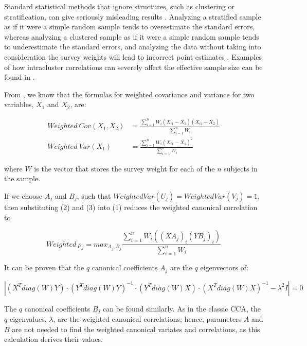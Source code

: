 Standard statistical methods that ignore structures, such as clustering or stratification, can give seriously misleading results \citep{holt1980}. Analyzing a stratified sample as if it were a simple random sample tends to overestimate the standard errors, whereas analyzing a clustered sample as if it were a simple random sample tends to underestimate the standard errors, and analyzing the data without taking into consideration the survey weights will lead to incorrect point estimates \citep{lumley2004}. Examples of how intracluster correlations can severely affect the effective sample size can be found in \citep{killip2004}.

From \citep{winship1994}, we know that the formulas for weighted covariance and variance for two variables, \(X_1\) and \(X_2\), are:

\begin{align}
Weighted\ Cov(X_1, X_2) &= \frac{\sum_{i=1}^{n}W_i(X_{i1} - \bar{X_{1}})(X_{i2} - \bar{X_{2}})}{\sum_{i=1}^{n}W_i}\\
Weighted\ Var(X_1) &= \frac{\sum_{i=1}^{n}W_i(X_{i1} - \bar{X_{1}})^2}{\sum_{i=1}^{n}W_i}
  \label{eq:weightedCovVar}
\end{align}

where \(W\) is the vector that stores the survey weight for each of the \(n\) subjects in the sample.

If we choose \(A_j\) and \(B_j\), such that \(Weighted Var(U_j )=Weighted Var(V_j )=1\), then substituting (2) and (3) into (1) reduces the weighted canonical correlation to

\begin{equation}
Weighted\ \rho_{j} = max_{A_j,B_j}\frac{\sum_{i=1}^nW_i((XA_j)_i(YB_j)_i)}{\sum_{i=1}^nW_i}
  \label{eq:weightedRho}    
\end{equation}

It can be proven that the \(q\) canonical coefficients \(A_j\) are the \(q\) eigenvectors of:

\begin{equation}
|(X^Tdiag(W)Y)\cdot (Y^Tdiag(W)Y)^{-1}\cdot (Y^Tdiag(W)X)\cdot (X^Tdiag(W)X)^{-1} - \lambda^2I|=0
  \label{eq:eigenvecEq}    
\end{equation}

The \(q\) canonical coefficients \(B_j\) can be found similarly. As in the classic CCA, the \(q\) eigenvalues, \(\lambda\), are the weighted canonical correlations; hence, parameters \(A\) and \(B\) are not needed to find the weighted canonical variates and correlations, as this calculation derives their values.

